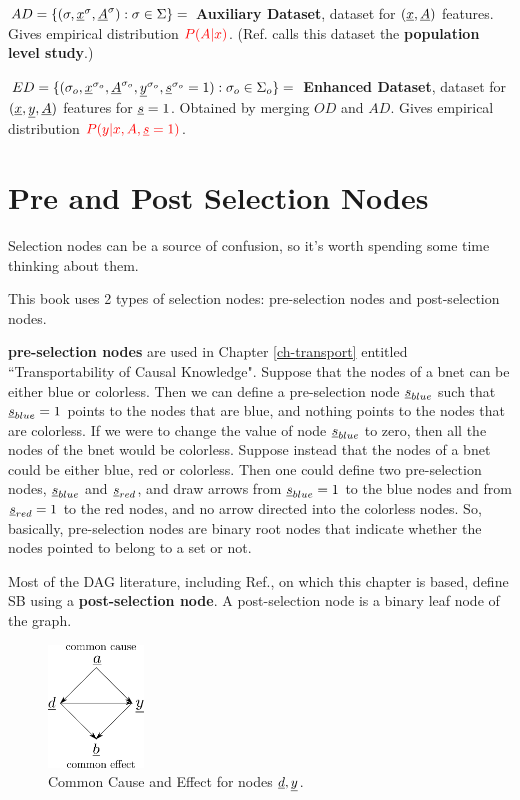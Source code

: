 $AD=\{(\sigma, {\underline{x}}^\sigma,{\underline{A}}^\sigma):\sigma\in\Sigma\}=$
{\bf Auxiliary Dataset}, dataset for $({\underline{x}}, {\underline{A}})$ features.
Gives empirical
distribution $\color{red}{P(A|x)}$.
(Ref.\cite{bare-sb-removal}
calls this dataset the
{\bf population level study}.)


$ED=\{({\sigma_o},{\underline{x}}^{\sigma_o}, {\underline{A}}^{\sigma_o}, {\underline{y}}^{\sigma_o},
{\underline{s}}^{\sigma_o}=1):{\sigma_o}\in\Sigma_o\}=$
{\bf Enhanced Dataset}, dataset for $({\underline{x}},{\underline{y}}, {\underline{A}})$ features
for ${\underline{s}}=1$.
Obtained by merging $OD$ and $AD$.
Gives empirical
distribution $\color{red}{P(y|x, A, {\underline{s}}=1)}$.

\section{Pre and Post Selection Nodes}
Selection
nodes can be a source
of confusion,
so it's worth
spending some time
thinking about them.

This book uses 2 types of selection nodes:
pre-selection nodes and post-selection nodes.

{\bf pre-selection nodes} are used
in Chapter \ref{ch-transport}
entitled ``Transportability
of Causal Knowledge".
Suppose that the nodes
of a bnet can be either
blue or colorless.
Then we can define
a pre-selection
node ${\underline{s}}_{blue}$
such that
${\underline{s}}_{blue}=1$
points
to the nodes that
are blue, and
nothing
points
to the nodes that are
colorless.
If we were to
change the value of
node ${\underline{s}}_{blue}$ to
zero,
then all the nodes
of the bnet would be colorless.
Suppose instead that
the nodes of a bnet
could be either
blue, red or colorless.
Then one could define
two pre-selection nodes,
${\underline{s}}_{blue}$
and ${\underline{s}}_{red}$,
and
draw arrows
from ${\underline{s}}_{blue}=1$
to the blue nodes
and from
${\underline{s}}_{red}=1$
to the red nodes, and no arrow
directed into the colorless nodes.
So, basically, pre-selection nodes
are binary {\color{red}root} nodes
that indicate
whether the nodes pointed to
belong to a set or not.

Most of the DAG literature,
including Ref.\cite{bare-sb-removal},
on which this chapter is based,
define SB using a {\bf post-selection node}.
A post-selection node
is a binary {\color {red}leaf} node
of the graph.

\begin{figure}[h!]
\centering
\includegraphics[width=1in]
{sb-removal/common-cause-effect.png}
\caption{Common Cause
and Effect for
nodes ${\underline{d}},{\underline{y}}$.}
\label{fig-common-cause-effect}
\end{figure}

